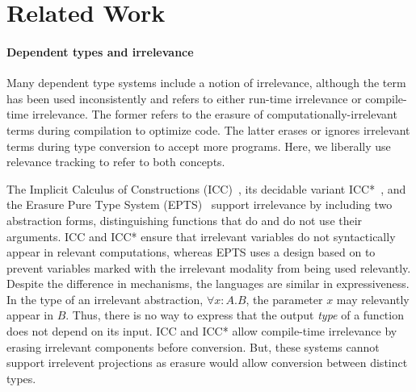 \documentclass[acmsmall, screen=true, nonacm=true,
  review=\ifpublic false\else true\fi,
  anonymous=\ifanonymous true\else false\fi
]{acmart}
\begin{document}
\section{Related Work}

\paragraph{Dependent types and irrelevance}
\label{sec:discuss-irrel}

Many dependent type systems include a notion of irrelevance, although the term
has been used inconsistently and refers to either run-time irrelevance or
compile-time irrelevance. The former refers to the erasure of
computationally-irrelevant terms during compilation to optimize code.
The latter erases or ignores irrelevant terms during type conversion to accept
more programs. Here, we liberally use relevance tracking to refer to both
concepts.

The Implicit Calculus of Constructions (ICC)~\citep{miquel:icc}, its decidable
variant ICC*~\citep{barras:icc}, and the Erasure Pure Type System
(EPTS)~\citep{mishra:erasure} support irrelevance by including two abstraction
forms, distinguishing functions that do and do not use their arguments.  ICC
and ICC* ensure that irrelevant variables do not syntactically appear in
relevant computations, whereas EPTS uses a design based on
\citet{pfenning:modal} to prevent variables marked with the irrelevant
modality from being used relevantly.  Despite the difference in mechanisms,
the languages are similar in expressiveness. In the type of an irrelevant
abstraction, $\forall x\!\!:\!\!A.B$, the parameter $x$ may relevantly
appear in $B$. Thus, there is no way to express that the output \emph{type}
of a function does not depend on its input.  ICC and ICC* allow
compile-time irrelevance by erasing irrelevant components before
conversion. But, these systems cannot support irrelevent projections
as erasure would allow conversion between distinct types.
\end{document}
